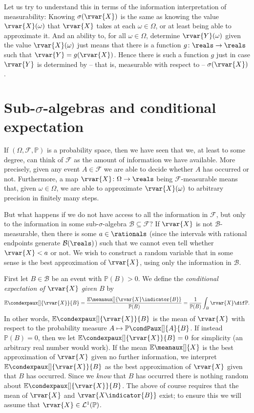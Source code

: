 \documentclass[article, a4paper, 11pt, oneside]{memoir}
\numberwithin{equation}{chapter}
\newcommand{\calB}{\mathcal{B}}
\newcommand{\calF}{\mathcal{F}}
\newcommand{\calL}{\mathcal{L}}
\newcommand{\borel}[1]{\calB(#1)}
\renewcommand{\P}{\mathbb{P}}
\renewcommand{\mean}[2][]{\mathbb{E}\meanaux[#1]{#2}}
\newcommand{\condexp}[3][]{{\mathbb{E}\condexpaux[#1]{#2}{#3}}}
\newcommand{\condP}[3][]{{\P\condPaux[#1]{#2}{#3}}}
\begin{document}
Let us try to understand this in terms of the information interpretation of measurability: Knowing $\sigma(\rvar{X})$ is the same as knowing the value $\rvar{X}(\omega)$ that $\rvar{X}$ takes at each $\omega \in \Omega$, or at least being able to approximate it. And an ability to, for all $\omega \in \Omega$, determine $\rvar{Y}(\omega)$ given the value $\rvar{X}(\omega)$ just means that there is a function $g \colon \reals \to \reals$ such that $\rvar{Y} = g(\rvar{X})$. Hence there is such a function $g$ just in case $\rvar{Y}$ is determined by -- that is, measurable with respect to -- $\sigma(\rvar{X})$.





\section[Sub-sigma-algebras and conditional expectation][Sub-$\sigma$-algebras and conditional expectation]{Sub-$\sigma$-algebras and conditional expectation}

If $(\Omega, \calF, \P)$ is a probability space, then we have seen that we, at least to some degree, can think of $\calF$ as the amount of information we have available. More precisely, given any event $A \in \calF$ we are able to decide whether $A$ has occurred or not. Furthermore, a map $\rvar{X} \colon \Omega \to \reals$ being $\calF$-measurable means that, given $\omega \in \Omega$, we are able to approximate $\rvar{X}(\omega)$ to arbitrary precision in finitely many steps.

But what happens if we do not have access to all the information in $\calF$, but only to the information in some sub-$\sigma$-algebra $\calB \subseteq \calF$? If $\rvar{X}$ is not $\calB$-measurable, then there is some $a \in \rationals$ (since the intervals with rational endpoints generate $\borel{\reals}$) such that we cannot even tell whether $\rvar{X} < a$ or not. We wish to construct a random variable that in some sense is the best approximation of $\rvar{X}$, using only the information in $\calB$.

First let $B \in \calB$ be an event with $\P(B) > 0$. We define the \emph{conditional expectation of $\rvar{X}$ given $B$} by
%
\begin{equation*}
    \condexp{\rvar{X}}{B}
        = \frac{\mean{\rvar{X} \indicator{B}}}{\P(B)}
        = \frac{1}{\P(B)} \int_B \rvar{X} \dif\P.
\end{equation*}
%
In other words, $\condexp{\rvar{X}}{B}$ is the mean of $\rvar{X}$ with respect to the probability measure $A \mapsto \condP{A}{B}$. If instead $\P(B) = 0$, then we let $\condexp{\rvar{X}}{B} = 0$ for simplicity (an arbitrary real number would work). If the mean $\mean{X}$ is the best approximation of $\rvar{X}$ given no further information, we interpret $\condexp{\rvar{X}}{B}$ as the best approximation of $\rvar{X}$ given that $B$ has occurred. Since we \emph{know} that $B$ has occurred there is nothing random about $\condexp{\rvar{X}}{B}$. The above of course requires that the mean of $\rvar{X}$ and $\rvar{X \indicator{B}}$ exist; to ensure this we will assume that $\rvar{X} \in \calL^1(\P)$.
\end{document}
